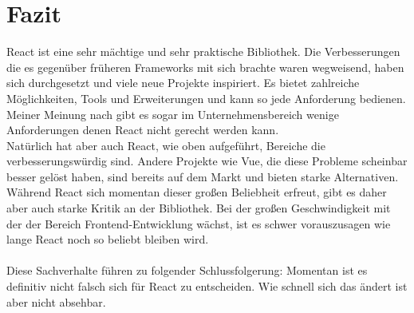 \section{Fazit}
React ist eine sehr mächtige und sehr praktische Bibliothek. Die Verbesserungen die es gegenüber früheren Frameworks mit sich brachte waren wegweisend, haben sich durchgesetzt und viele neue Projekte inspiriert. Es bietet zahlreiche Möglichkeiten, Tools und Erweiterungen und kann so jede Anforderung bedienen. Meiner Meinung nach gibt es sogar im Unternehmensbereich wenige Anforderungen denen React nicht gerecht werden kann. \\
Natürlich hat aber auch React, wie oben aufgeführt, Bereiche die verbesserungswürdig sind. Andere Projekte wie Vue, die diese Probleme scheinbar besser gelöst haben, sind bereits auf dem Markt und bieten starke Alternativen. Während React sich momentan dieser großen Beliebheit erfreut, gibt es daher aber auch starke Kritik an der Bibliothek. Bei der großen Geschwindigkeit mit der der Bereich Frontend-Entwicklung wächst, ist es schwer vorauszusagen wie lange React noch so beliebt bleiben wird. \\\\
Diese Sachverhalte führen zu folgender Schlussfolgerung: Momentan ist es definitiv nicht falsch sich für React zu entscheiden. Wie schnell sich das ändert ist aber nicht absehbar. 